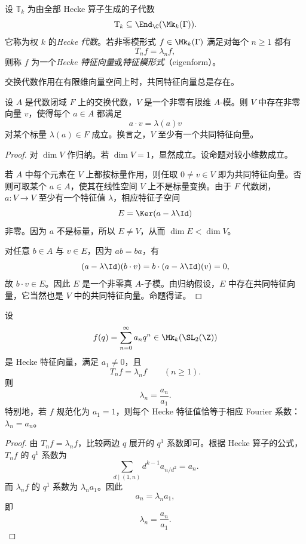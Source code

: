 \begin{definition}
设 $\mathbb{T}_k$ 为由全部 Hecke 算子生成的子代数
\[
\mathbb{T}_k\subseteq \End_{\C}(\Mk_k(\Gamma)).
\]
它称为权 $k$ 的\emph{Hecke 代数}。若非零模形式 $f\in \Mk_k(\Gamma)$ 满足对每个 $n\ge 1$ 都有
\[
T_nf=\lambda_n f,
\]
则称 $f$ 为一个\emph{Hecke 特征向量}或\emph{特征模形式}（eigenform）。
\end{definition}

交换代数作用在有限维向量空间上时，共同特征向量总是存在。

\begin{proposition}
设 $A$ 是代数闭域 $F$ 上的交换代数，$V$ 是一个非零有限维 $A$-模。则 $V$ 中存在非零向量 $v$，使得每个 $a\in A$ 都满足
\[
a\cdot v=\lambda(a)v
\]
对某个标量 $\lambda(a)\in F$ 成立。换言之，$V$ 至少有一个共同特征向量。
\end{proposition}

\begin{proof}
对 $\dim V$ 作归纳。若 $\dim V=1$，显然成立。设命题对较小维数成立。

若 $A$ 中每个元素在 $V$ 上都按标量作用，则任取 $0\neq v\in V$ 即为共同特征向量。否则可取某个 $a\in A$，使其在线性空间 $V$ 上不是标量变换。由于 $F$ 代数闭，$a:V\to V$ 至少有一个特征值 $\lambda$，相应特征子空间
\[
E=\Ker(a-\lambda\Id)
\]
非零。因为 $a$ 不是标量，所以 $E\neq V$，从而 $\dim E<\dim V$。

对任意 $b\in A$ 与 $v\in E$，因为 $ab=ba$，有
\[
(a-\lambda\Id)(b\cdot v)=b\cdot (a-\lambda\Id)(v)=0,
\]
故 $b\cdot v\in E$。因此 $E$ 是一个非零真 $A$-子模。由归纳假设，$E$ 中存在共同特征向量，它当然也是 $V$ 中的共同特征向量。命题得证。
\end{proof}

\begin{proposition}
设
\[
f(q)=\sum_{n=0}^{\infty}a_nq^n\in \Mk_k(\SL_2(\Z))
\]
是 Hecke 特征向量，满足 $a_1\neq 0$，且
\[
T_nf=\lambda_n f\qquad (n\ge 1).
\]
则
\[
\lambda_n=\frac{a_n}{a_1}.
\]
特别地，若 $f$ 规范化为 $a_1=1$，则每个 Hecke 特征值恰等于相应 Fourier 系数：$\lambda_n=a_n$。
\end{proposition}

\begin{proof}
由 $T_nf=\lambda_nf$，比较两边 $q$ 展开的 $q^1$ 系数即可。根据 Hecke 算子的公式，$T_nf$ 的 $q^1$ 系数为
\[
\sum_{d\mid (1,n)}d^{k-1}a_{n/d^2}=a_n.
\]
而 $\lambda_nf$ 的 $q^1$ 系数为 $\lambda_n a_1$。因此
\[
a_n=\lambda_n a_1,
\]
即
\[
\lambda_n=\frac{a_n}{a_1}.
\]
\end{proof}

